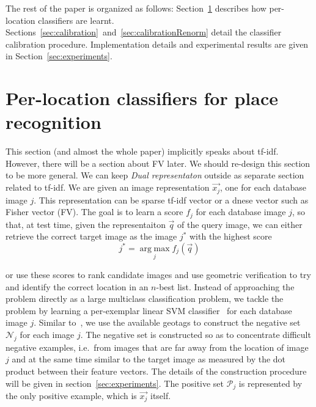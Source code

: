    The rest of the paper is organized as follows: Section~\ref{sec:classifiers} describes how per-location classifiers are learnt. Sections~\ref{sec:calibration}~and~\ref{sec:calibrationRenorm} detail the classifier calibration procedure.   Implementation details and experimental results are given in Section~\ref{sec:experiments}.

\section{Per-location classifiers for place recognition}
\label{sec:classifiers}
  \textcolor{myGrey}{
  This section (and almost the whole paper) implicitly speaks about tf-idf. However, there will be a section about FV later. We should re-design this section to be more general. We can keep \emph{Dual representaton} outside as separate section related to tf-idf.
  } \newline
   We are given an image representation $\vec{x_j}$, one for each database image $j$. This representation can be sparse tf-idf vector or a dnese vector such as Fisher vector (FV). The goal is to learn a score $f_j$ for each database image $j$, so that, at test time, given the representaiton $\vec{q}$ of the query image, we can either retrieve the correct target image as the image $j^*$ with the highest score 
   \begin{equation}
   \label{eq:class}
    j^*=\operatorname*{arg\;max}_{j} f_j(\vec{q}) 
   \end{equation}

   \noindent
   or use these scores to rank candidate images and use geometric verification to try and identify the correct location in an $n$-best list.
   Instead of approaching the problem directly as a large multiclass classification problem, we tackle the problem by learning a per-exemplar linear SVM classifier~\cite{Malisiewicz11}  for each database image $j$.
   Similar to~\cite{Knopp2010}, we use the available geotags to construct the negative set $\mathcal N_j$ for each image $j$. The negative set is constructed so as to concentrate difficult negative examples, i.e.\ from images that are far away from the location of image $j$ and at the same time similar to the target image as measured by the dot product between their feature vectors. The details of the construction procedure will be given in section~\ref{sec:experiments}.  The positive set $\mathcal P_j$ is represented by the only positive example, which is $\vec{x_j}$ itself. 

